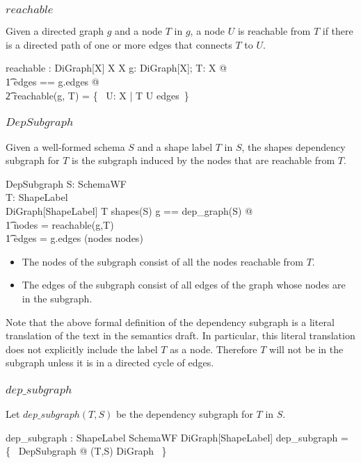 \documentclass{article}
\begin{document}
\subsubsection{$reachable$}
Given a directed graph $g$ and a node $T$ in $g$, a node $U$ is reachable from $T$ if there is a directed path of one or more edges that connects
$T$ to $U$.
\begin{gendef}[X]
	reachable : DiGraph[X] \cross X \fun \power X
\where
	\forall g: DiGraph[X]; T: X @ \\
\t1		\LET edges == g.edges @ \\
\t2			reachable(g, T) = \{~ U: X | T \mapsto U \in edges\plus ~\}
\end{gendef}

\subsubsection{$DepSubgraph$}
Given a well-formed schema $S$ and a shape label $T$ in $S$, the shapes dependency
subgraph for $T$ is the subgraph induced by the nodes that are reachable from $T$.
\begin{schema}{DepSubgraph}
	S: SchemaWF \\
	T: ShapeLabel \\
	DiGraph[ShapeLabel]
\where
	T \in shapes(S)
\also
	\LET g == dep\_graph(S) @ \\
\t1		nodes = reachable(g,T) \land \\
\t1		edges = g.edges \cap (nodes \cross nodes)
\end{schema}
\begin{itemize}
\item The nodes of the subgraph consist of all the nodes reachable from $T$.
\item The edges of the subgraph consist of all edges of the graph whose nodes are in the subgraph.
\end{itemize}

Note that the above formal definition of the dependency subgraph is a literal translation of the text in the semantics draft.
In particular, this literal translation does not explicitly include the label $T$ as a node.
Therefore $T$ will not be in the subgraph unless it is in a directed cycle of edges.

\subsubsection{$dep\_subgraph$}
Let $dep\_subgraph(T,S)$ be the dependency subgraph for $T$ in $S$.
\begin{axdef}
	dep\_subgraph : ShapeLabel \cross SchemaWF \pfun DiGraph[ShapeLabel]
\where
	dep\_subgraph = \{~ DepSubgraph @ (T,S) \mapsto \theta DiGraph ~\}
\end{axdef}
\end{document}

